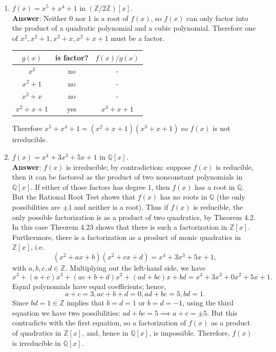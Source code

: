 \documentclass{article}
\begin{document}
\begin{enumerate}
\begin{enumerate}
                  \item $f(x)=x^5+x^4+1$ in $(\mathbb{Z}/2\mathbb{Z})[x]$.\\
                        \textbf{Answer}: Neither $0$ nor $1$ is a root of $f(x)$, so $f(x)$ can only factor into the product of a quadratic polynomial and a cubic polynomial. Therefore one of $x^2,x^2+1,x^2+x,x^2+x+1$ must be a factor.
                        \begin{center}
                              \begin{tabular}{|c|c|c|}
                                    \hline
                                    $g(x)$    & is factor? & $f(x)/g(x)$ \\
                                    \hline
                                    $x^2$     & no         & -           \\
                                    \hline
                                    $x^2+1$   & no         & -           \\
                                    \hline
                                    $x^2+x$   & no         & -           \\
                                    \hline
                                    $x^2+x+1$ & yes        & $x^3+x+1$   \\
                                    \hline
                              \end{tabular}
                        \end{center}
                        Therefore $x^5+x^4+1=(x^2+x+1)(x^3+x+1)$ so $f(x)$ is not irreducible.
                  \item $f(x)=x^4+3x^3+5x+1$ in $\mathbb{Q}[x]$.\\
                        \textbf{Answer}: $f(x)$ is irreducible; by contradiction: suppose $f(x)$ is reducible, then it can be factored as the product of two nonconstant polynomials in $\mathbb{Q}[x]$. If either of those factors has degree $1$, then $f(x)$ has a root in $\mathbb{Q}$. But the Rational Root Test shows that $f(x)$ has no roots in $\mathbb{Q}$ (the only possibilities are $\pm 1$ and neither is a root). Thus if $f(x)$ is reducible, the only possible factorization is as a product of two quadratics, by Theorem 4.2. In this case Theorem 4.23 shows that there is such a factorization in $\mathbb{Z}[x]$. Furthermore, there is a factorization as a product of monic quadratics in $\mathbb{Z}[x]$, i.e. \[(x^2+ax+b)(x^2+cx+d)=x^4+3x^3+5x+1,\] with $a,b,c,d\in\mathbb{Z}$. Multiplying out the left-hand side, we have \[x^4+(a+c)x^3+(ac+b+d)x^2+(ad+bc)x+bd=x^4+3x^3+0x^2+5x+1.\] Equal polynomials have equal coefficients; hence, \[a+c=3,ac+b+d=0,ad+bc=5,bd=1.\] Since $bd=1\in\mathbb{Z}$ implies that $b=d=1$ or $b=d=-1$, using the third equation we have two possibilities: $ad+bc=5\implies a+c=\pm 5$. But this contradicts with the first equation, so a factorization of $f(x)$ as a product of quadratics in $\mathbb{Z}[x]$, and, hence in $\mathbb{Q}[x]$, is impossible. Therefore, $f(x)$ is irreducible in $\mathbb{Q}[x]$.

\end{enumerate}
\end{enumerate}
\end{document}
